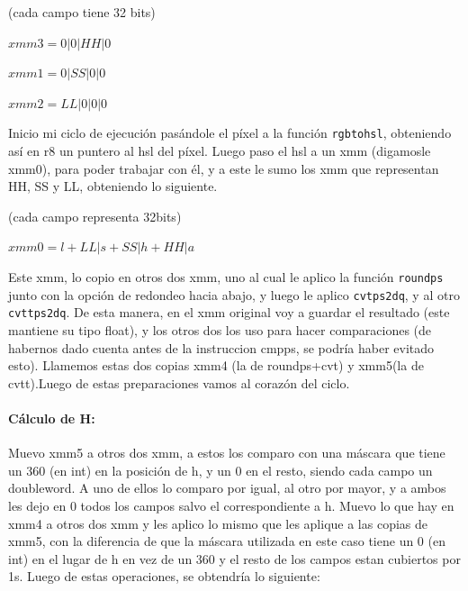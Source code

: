\documentclass[a4paper]{article}
\begin{document}
\vspace*{0.3cm}

(cada campo tiene 32 bits)

\vspace*{0.3cm}

$xmm3=0|0|HH|0$

\vspace*{0.3cm} 

$xmm1=0|SS|0|0$

\vspace*{0.3cm}

$xmm2=LL|0|0|0$

\vspace*{0.3cm}

Inicio mi ciclo de ejecución pasándole el píxel a la función {\tt rgbtohsl}, obteniendo así en r8 un puntero al hsl del píxel. Luego paso el hsl a un xmm (digamosle xmm0), para poder trabajar con él, y a este le sumo los xmm que representan HH, SS y LL, obteniendo lo siguiente.

(cada campo representa 32bits)

\vspace*{0.3cm}

$xmm0=l+LL|s+SS|h+HH|a$

\vspace*{0.3cm}

Este xmm, lo copio en otros dos xmm, uno al cual le aplico la función {\tt roundps} junto con la opción de redondeo hacia abajo, y luego le aplico {\tt cvtps2dq}, y al otro {\tt cvttps2dq}. De esta manera, en el xmm original voy a guardar el resultado (este mantiene su tipo float), y los otros dos los uso para hacer comparaciones (de habernos dado cuenta antes de la instruccion cmpps, se podría haber evitado esto). Llamemos estas dos copias xmm4 (la de roundps+cvt) y xmm5(la de cvtt).Luego de estas preparaciones vamos al corazón del ciclo.

\paragraph*{Cálculo de H:}

Muevo xmm5 a otros dos xmm, a estos los comparo con una máscara que tiene un 360 (en int) en la posición de h, y un 0 en el resto, siendo cada campo un doubleword. A uno de ellos lo comparo por igual, al otro por mayor, y a ambos les dejo en 0 todos los campos salvo el correspondiente a h. Muevo lo que hay en xmm4 a otros dos xmm y les aplico lo mismo que les aplique a las copias de xmm5, con la diferencia de que la máscara utilizada en este caso tiene un 0 (en int) en el lugar de h en vez de un 360 y el resto de los campos estan cubiertos por 1s. Luego de estas operaciones, se obtendría lo siguiente:
\end{document}
